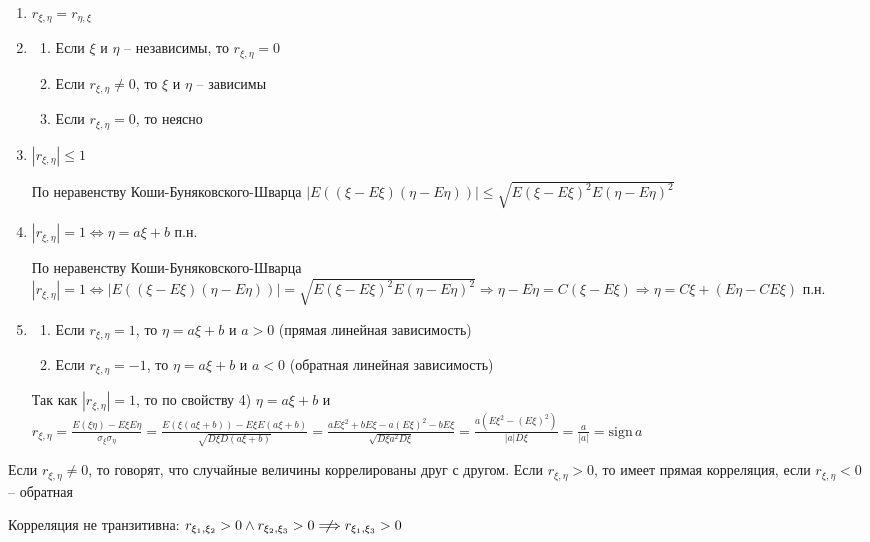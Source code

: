 \begin{enumerate}
    \item $r_{\xi, \eta} = r_{\eta, \xi}$

    \item \begin{enumerate}
        \item Если $\xi$ и $\eta$ -- независимы, то $r_{\xi,\eta} = 0$

        \item Если $r_{\xi,\eta} \neq 0$, то $\xi$ и $\eta$ -- зависимы

        \item Если $r_{\xi,\eta} = 0$, то неясно
    \end{enumerate}

    \item $|r_{\xi,\eta}| \leq 1$

    \begin{MyProof}
        По неравенству Коши-Буняковского-Шварца $|E((\xi - E\xi)(\eta - E\eta))| \leq \sqrt{E(\xi - E\xi)^2 E(\eta - E\eta)^2}$
    \end{MyProof}

    \item $|r_{\xi,\eta}| = 1 \Longleftrightarrow \eta = a \xi + b$ п.н.

    \begin{MyProof}
        По неравенству Коши-Буняковского-Шварца $|r_{\xi,\eta}| = 1 \Longleftrightarrow 
        |E((\xi - E\xi)(\eta - E\eta))| = \sqrt{E(\xi - E\xi)^2 E(\eta - E\eta)^2} \Longrightarrow \eta - E\eta = C(\xi - E\xi) \Longrightarrow \eta = C\xi + (E\eta - CE\xi)$ п.н.
    \end{MyProof}

    \item \begin{enumerate} 
        \item Если $r_{\xi,\eta} = 1$, то $\eta = a\xi + b$ и $a > 0$ (прямая линейная зависимость)

        \item Если $r_{\xi,\eta} = -1$, то $\eta = a\xi + b$ и $a < 0$ (обратная линейная зависимость)
    \end{enumerate}

    \begin{MyProof}
        Так как $|r_{\xi,\eta}| = 1$, то по свойству 4) $\eta = a\xi + b$ и $r_{\xi,\eta} = \frac{E(\xi\eta) - E\xi E\eta}{\sigma_\xi \sigma_\eta} = 
        \frac{E(\xi(a\xi + b)) - E\xi E(a\xi + b)}{\sqrt{D\xi D(a\xi + b)}} = \frac{aE\xi^2 + bE\xi - a(E\xi)^2 - bE\xi}{\sqrt{D\xi a^2 D\xi}} = \frac{a(E\xi^2 - (E\xi)^2)}{|a|D\xi} = \frac{a}{|a|} = \mathrm{sign} \,a$
    \end{MyProof}
\end{enumerate}

\Def Если $r_{\xi,\eta} \neq 0$, то говорят, что случайные величины коррелированы друг с другом. Если $r_{\xi,\eta} > 0$, 
то имеет прямая корреляция, если $r_{\xi,\eta} < 0$ -- обратная

\Nota Корреляция не транзитивна: $r_{\xi_1,\xi_2} > 0 \land r_{\xi_2,\xi_3} > 0 \centernot\Longrightarrow r_{\xi_1,\xi_3} > 0$

